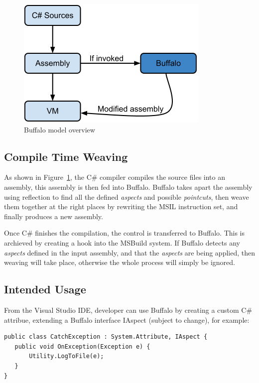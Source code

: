 \begin{figure}[here]
  \includegraphics[scale=0.70]{model_overview.png}
  \centering
  \caption{Buffalo model overview\label{buffalo_model}}
\end{figure}

\subsection{Compile Time Weaving}
As shown in Figure~\ref{buffalo_model}, the C\# compiler compiles the source files into an assembly, this assembly is then fed into Buffalo. Buffalo takes apart the assembly using reflection to find all the defined {\em aspects} and possible {\em pointcuts}, then weave them together at the right places by rewriting the MSIL instruction set, and finally produces a new assembly.

Once C\# finishes the compilation, the control is transferred to Buffalo. This is archieved by creating a hook into the MSBuild system. If Buffalo detects any {\em aspects} defined in the input assembly, and that the {\em aspects} are being applied, then weaving will take place, otherwise the whole process will simply be ignored.

\subsection{Intended Usage}
From the Visual Studio IDE, developer can use Buffalo by creating a custom C\# attribue, extending a Buffalo interface IAspect (subject to change), for example:

\begin{lstlisting}[caption={Buffalo aspect}, label=buffalocode]
public class CatchException : System.Attribute, IAspect {
   public void OnException(Exception e) {
       Utility.LogToFile(e);
   } 
}
\end{lstlisting}

